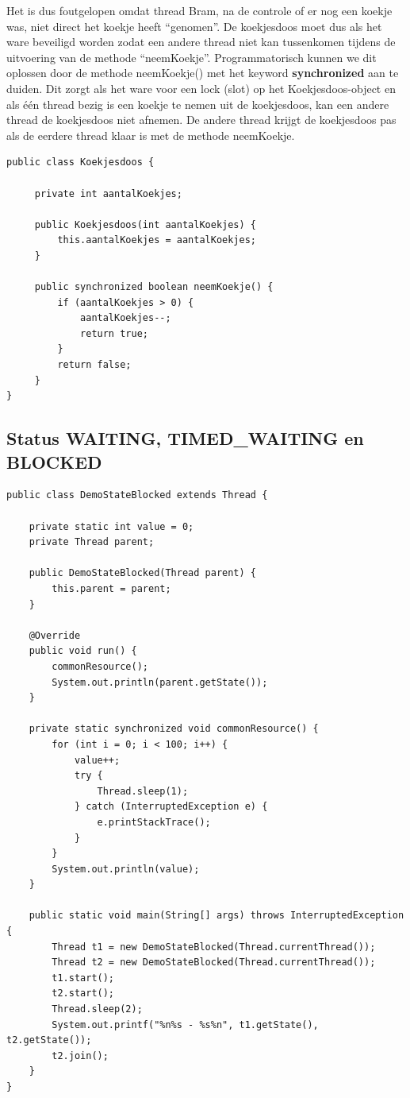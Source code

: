 \documentclass{tstextbook}
\begin{document}
Het is dus foutgelopen omdat thread Bram, na de controle of er nog een koekje was, niet direct het koekje heeft ``genomen''.
De koekjesdoos moet dus als het ware beveiligd worden zodat een andere thread niet kan tussenkomen tijdens de uitvoering van de methode ``neemKoekje''.
Programmatorisch kunnen we dit oplossen door de methode neemKoekje() met het keyword \textbf{synchronized} aan te duiden. Dit zorgt als het ware voor een lock (slot) op het Koekjesdoos-object en als \'e\'en thread bezig is een koekje te nemen uit de koekjesdoos, kan een andere thread de koekjesdoos niet afnemen. De andere thread krijgt de koekjesdoos pas als de eerdere thread klaar is met de methode neemKoekje.

\begin{lstlisting}
public class Koekjesdoos {  
     
     private int aantalKoekjes;      
     
     public Koekjesdoos(int aantalKoekjes) {      
         this.aantalKoekjes = aantalKoekjes;   
     }      
     
     public synchronized boolean neemKoekje() {      
         if (aantalKoekjes > 0) {         
             aantalKoekjes--;         
             return true;      
         }     
         return false;  
     }
}
\end{lstlisting}

\subsection{Status WAITING, TIMED\_WAITING en BLOCKED}

\begin{lstlisting}
public class DemoStateBlocked extends Thread {

	private static int value = 0;
	private Thread parent;

	public DemoStateBlocked(Thread parent) {
		this.parent = parent;
	}

	@Override
	public void run() {
		commonResource();
		System.out.println(parent.getState());
	}

	private static synchronized void commonResource() {
		for (int i = 0; i < 100; i++) {
			value++;
			try {
				Thread.sleep(1);
			} catch (InterruptedException e) {
				e.printStackTrace();
			}
		}
		System.out.println(value);
	}

	public static void main(String[] args) throws InterruptedException {
		Thread t1 = new DemoStateBlocked(Thread.currentThread());
		Thread t2 = new DemoStateBlocked(Thread.currentThread());
		t1.start();
		t2.start();
		Thread.sleep(2);
		System.out.printf("%n%s - %s%n", t1.getState(), t2.getState());
		t2.join();
	}
}
\end{lstlisting}
\end{document}
